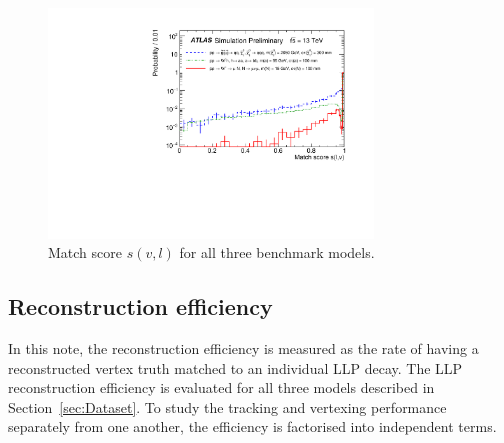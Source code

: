 \documentclass[PUB,UKenglish, texlive=2018]{\ATLASLATEXPATH atlasdoc}
\begin{document}

\begin{figure}[t]
\begin{center}
\includegraphics[width=0.77\textwidth]{figures/final/VSI_matchScore_inclusive.pdf}
\caption{Match score $s(v,l)$ for all three benchmark models.}
\label{fig:match_score}
\end{center}
\end{figure}


\subsection{Reconstruction efficiency \label{sec:effDef} }

In this note, the reconstruction efficiency is measured as the rate of having a reconstructed vertex truth matched to an individual LLP decay.
The LLP reconstruction efficiency is evaluated for all three models described in Section~\ref{sec:Dataset}.
To study the tracking and vertexing performance separately from one another, the efficiency is factorised into independent terms.
\end{document}
